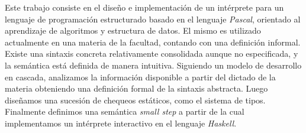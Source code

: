Este trabajo consiste en el diseño e implementación de un intérprete para un lenguaje de programación estructurado basado en el lenguaje \textit{Pascal}, orientado al aprendizaje de algoritmos y estructura de datos.
El mismo es utilizado actualmente en una materia de la facultad, contando con una definición informal.
Existe una sintaxis concreta relativamente consolidada aunque no especificada, y la semántica está definida de manera intuitiva.
Siguiendo un modelo de desarrollo en cascada, analizamos la información disponible a partir del dictado de la materia obteniendo una definición formal de la sintaxis abstracta.
Luego diseñamos una sucesión de chequeos estáticos, como el sistema de
tipos.
Finalmente definimos una semántica \textit{small step} a partir de la cual implementamos un intérprete interactivo en el lenguaje \textit{Haskell}.